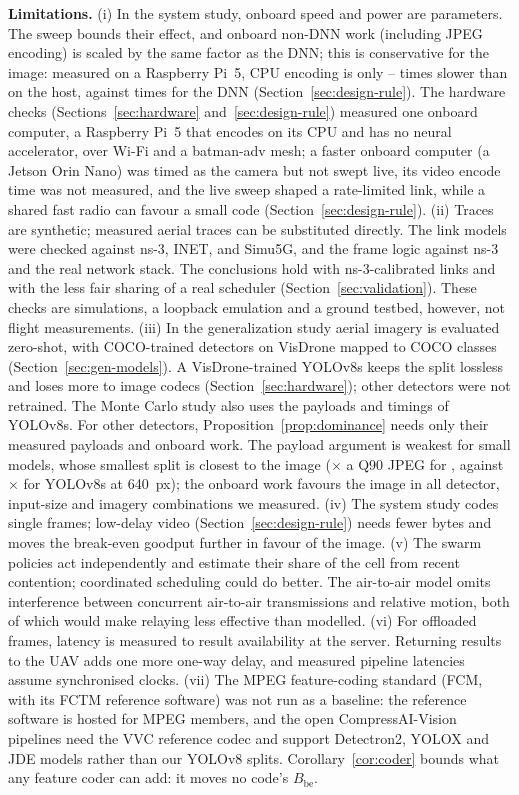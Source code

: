 \documentclass[journal,twocolumn,10pt]{IEEEtran}
\begin{document}
\textbf{Limitations.} (i) In the system study, onboard speed and power are parameters. The sweep bounds their effect, and onboard non-DNN work (including JPEG encoding) is scaled by the same factor as the DNN; this is conservative for the image: measured on a Raspberry Pi~5, CPU encoding is only \BpRatioMin--\BpJpegRatio{} times slower than on the host, against \BpScale{} times for the DNN (Section~\ref{sec:design-rule}). The hardware checks (Sections~\ref{sec:hardware} and~\ref{sec:design-rule}) measured one onboard computer, a Raspberry Pi~5 that encodes on its CPU and has no neural accelerator, over Wi-Fi and a batman-adv mesh; a faster onboard computer (a Jetson Orin Nano) was timed as the camera but not swept live, its video encode time was not measured, and the live sweep shaped a rate-limited link, while a shared fast radio can favour a small code (Section~\ref{sec:design-rule}). (ii) Traces are synthetic; measured aerial traces can be substituted directly. The link models were checked against ns-3, INET, and Simu5G, and the frame logic against ns-3 and the real network stack. The conclusions hold with ns-3-calibrated links and with the less fair sharing of a real scheduler (Section~\ref{sec:validation}). These checks are simulations, a loopback emulation and a ground testbed, however, not flight measurements. (iii) In the generalization study aerial imagery is evaluated zero-shot, with COCO-trained detectors on VisDrone mapped to COCO classes (Section~\ref{sec:gen-models}). A VisDrone-trained YOLOv8s keeps the split lossless and loses more to image codecs (Section~\ref{sec:hardware}); other detectors were not retrained. The Monte Carlo study also uses the payloads and timings of YOLOv8s. For other detectors, Proposition~\ref{prop:dominance} needs only their measured payloads and onboard work. The payload argument is weakest for small models, whose smallest split is closest to the image (\GenRatioMin$\times$ a Q90 JPEG for \GenRatioMinModel, against \GenResRatioSixForty$\times$ for YOLOv8s at 640~px); the onboard work favours the image in all \GenOnboardFavoursImageRows{} detector, input-size and imagery combinations we measured. (iv) The system study codes single frames; low-delay video (Section~\ref{sec:design-rule}) needs fewer bytes and moves the break-even goodput further in favour of the image. (v) The swarm policies act independently and estimate their share of the cell from recent contention; coordinated scheduling could do better. The air-to-air model omits interference between concurrent air-to-air transmissions and relative motion, both of which would make relaying less effective than modelled. (vi) For offloaded frames, latency is measured to result availability at the server. Returning results to the UAV adds one more one-way delay, and measured pipeline latencies assume synchronised clocks. (vii) The MPEG feature-coding standard (FCM, with its FCTM reference software) was not run as a baseline: the reference software is hosted for MPEG members, and the open CompressAI-Vision pipelines need the VVC reference codec and support Detectron2, YOLOX and JDE models rather than our YOLOv8 splits. Corollary~\ref{cor:coder} bounds what any feature coder can add: it moves no code's $B_{\mathrm{be}}$.
\end{document}
